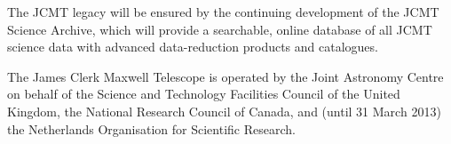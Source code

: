 \documentclass[]{spie}  %
\begin{document}
The JCMT legacy will be ensured by the continuing development of the
JCMT Science Archive,\cite{jsahistory} which will provide a searchable,
online database of all JCMT science data with advanced data-reduction
products and catalogues.\cite{2014SPIE9152-93}

\acknowledgments     %

The James Clerk Maxwell Telescope is operated by the Joint Astronomy
Centre on behalf of the Science and Technology Facilities Council of
the United Kingdom, the National Research Council of Canada, and
(until 31 March 2013) the Netherlands Organisation for Scientific
Research.



\end{document}
